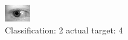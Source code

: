 \begin{figure}[h!]
\begin{center}
\includegraphics[width=0.60\columnwidth]{figures/ID783_class_2_target_4.png}
\end{center}
\caption{ Classification: 2 actual target: 4}
\label{fig:ID783_class_2_target_4}
\end{figure}
